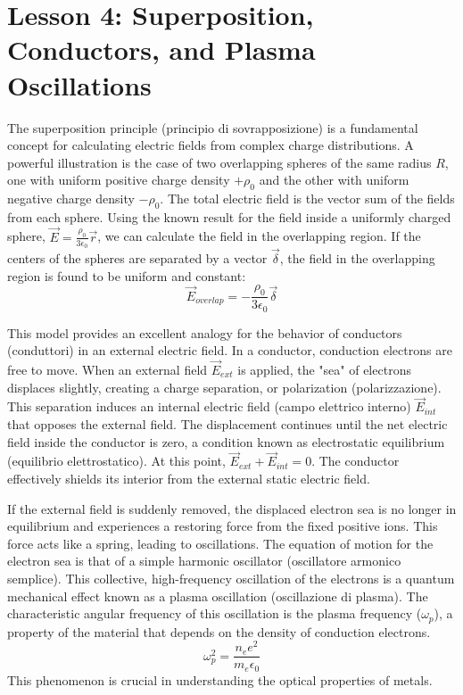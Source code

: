 \section*{Lesson 4: Superposition, Conductors, and Plasma Oscillations}

The superposition principle (principio di sovrapposizione) is a fundamental concept for calculating electric fields from complex charge distributions. A powerful illustration is the case of two overlapping spheres of the same radius \(R\), one with uniform positive charge density \(+\rho_0\) and the other with uniform negative charge density \(-\rho_0\). The total electric field is the vector sum of the fields from each sphere. Using the known result for the field inside a uniformly charged sphere, \(\vec{E} = \frac{\rho_0}{3\epsilon_0}\vec{r}\), we can calculate the field in the overlapping region. If the centers of the spheres are separated by a vector \(\vec{\delta}\), the field in the overlapping region is found to be uniform and constant:
\begin{equation}
\vec{E}_{overlap} = -\frac{\rho_0}{3\epsilon_0}\vec{\delta}
\end{equation}

This model provides an excellent analogy for the behavior of conductors (conduttori) in an external electric field. In a conductor, conduction electrons are free to move. When an external field \(\vec{E}_{ext}\) is applied, the "sea" of electrons displaces slightly, creating a charge separation, or polarization (polarizzazione). This separation induces an internal electric field (campo elettrico interno) \(\vec{E}_{int}\) that opposes the external field. The displacement continues until the net electric field inside the conductor is zero, a condition known as electrostatic equilibrium (equilibrio elettrostatico). At this point, \(\vec{E}_{ext} + \vec{E}_{int} = 0\). The conductor effectively shields its interior from the external static electric field.

If the external field is suddenly removed, the displaced electron sea is no longer in equilibrium and experiences a restoring force from the fixed positive ions. This force acts like a spring, leading to oscillations. The equation of motion for the electron sea is that of a simple harmonic oscillator (oscillatore armonico semplice). This collective, high-frequency oscillation of the electrons is a quantum mechanical effect known as a plasma oscillation (oscillazione di plasma). The characteristic angular frequency of this oscillation is the plasma frequency (\(\omega_p\)), a property of the material that depends on the density of conduction electrons.
\begin{equation}
\omega_p^2 = \frac{n_e e^2}{m_e\epsilon_0}
\end{equation}
This phenomenon is crucial in understanding the optical properties of metals.